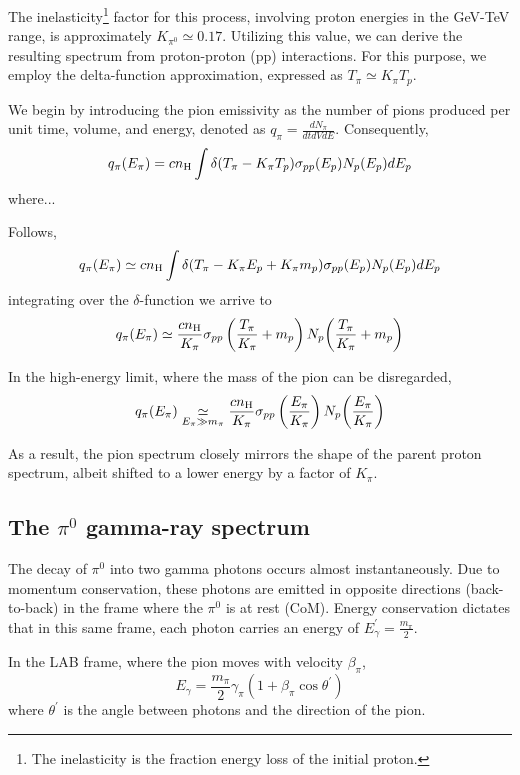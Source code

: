 The inelasticity\footnote{The inelasticity is the fraction energy loss of the initial proton.} factor for this process, involving proton energies in the GeV-TeV range, is approximately \( K_{\pi^0} \simeq 0.17 \). Utilizing this value, we can derive the resulting spectrum from proton-proton (pp) interactions. For this purpose, we employ the delta-function approximation, expressed as \( T_\pi \simeq K_\pi T_p \).

We begin by introducing the pion emissivity as the number of pions produced per unit time, volume, and energy, denoted as \( q_\pi = \frac{dN_\pi}{dt dV dE} \). Consequently,
%
\[
q_\pi (E_\pi) = c n_{\rm H} \int \delta(T_\pi - K_\pi T_p) \sigma_{pp} (E_p) {N_p(E_p)} dE_p
\]
%
where...

Follows,
\[
q_\pi (E_\pi) \simeq c n_{\rm H} \int \delta(T_\pi - K_\pi E_p + K_\pi m_p) \sigma_{pp}(E_p) {N_p(E_p)} dE_p
\]
%
integrating over the $\delta$-function we arrive to
%
\[
q_\pi (E_\pi) \simeq \frac{c n_{\rm H}}{K_\pi} \sigma_{pp} \left(\frac{T_\pi}{K_\pi} + m_p \right) N_p \! \left(\frac{T_\pi}{K_\pi} + m_p \right)
\]

In the high-energy limit, where the mass of the pion can be disregarded,
%
\[
q_\pi (E_\pi) \underset{E_\pi \gg m_\pi}{\simeq} \frac{c n_{\rm H}}{K_\pi} \sigma_{pp}\left(\frac{E_\pi}{K_\pi}\right) N_p \! \left(\frac{E_\pi}{K_\pi} \right)
\]

As a result, the pion spectrum closely mirrors the shape of the parent proton spectrum, albeit shifted to a lower energy by a factor of \( K_\pi \).

\subsection{The $\pi^0$ gamma-ray spectrum}

The decay of \(\pi^0\) into two gamma photons occurs almost instantaneously. Due to momentum conservation, these photons are emitted in opposite directions (back-to-back) in the frame where the \(\pi^0\) is at rest (CoM). 
%
Energy conservation dictates that in this same frame, each photon carries an energy of \(E^\prime_\gamma = \frac{m_\pi}{2}\).

In the LAB frame, where the pion moves with velocity $\beta_\pi$,
%
\begin{equation}\label{eq:egamma}
E_\gamma = \frac{m_\pi}{2} \gamma_\pi (1+\beta_\pi \cos \theta^\prime)
\end{equation}
%
where $\theta^\prime$ is the angle between photons and the direction of the pion.

